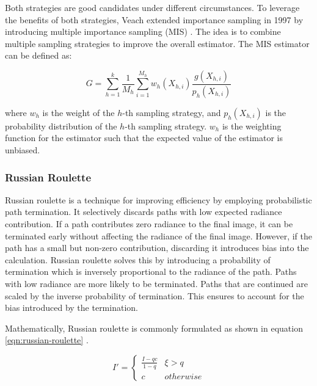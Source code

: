 Both strategies are good candidates under different circumstances. To leverage the benefits of both strategies, Veach extended importance sampling in 1997 by introducing multiple importance sampling (\gls{MIS}) \cite{veachMonteCarloLightTransport}. The idea is to combine multiple sampling strategies to improve the overall estimator. The \gls{MIS} estimator can be defined as:

\begin{equation}
  G = \sum_{h=1}^k \frac{1}{M_h}\sum_{i=1}^{M_h} w_h(X_{h,i})\frac{g(X_{h,i})}{p_h(X_{h,i})}
  \label{eq:multipleImportanceSampling}
\end{equation}

where $w_h$ is the weight of the $h$-th sampling strategy, and $p_h(X_{h,i})$ is the probability distribution of the $h$-th sampling strategy. $w_h$ is the weighting function for the estimator such that the expected value of the estimator is unbiased.

\subsubsection{Russian Roulette}
\label{ch:russianRoulette}

Russian roulette is a technique for improving efficiency by employing probabilistic path termination. It selectively discards paths with low expected radiance contribution. If a path contributes zero radiance to the final image, it can be terminated early without affecting the radiance of the final image. However, if the path has a small but non-zero contribution, discarding it introduces bias into the calculation. Russian roulette solves this by introducing a probability of termination which is inversely proportional to the radiance of the path. Paths with low radiance are more likely to be terminated. Paths that are continued are scaled by the inverse probability of termination. This ensures to account for the bias introduced by the termination.

Mathematically, Russian roulette is commonly formulated as shown in equation \ref{eqn:russian-roulette} \cite{Pharr_Physically_Based_Rendering_2023}.

\begin{equation}
  \label{eqn:russian-roulette}
  I' = \begin{cases} \frac{I-qc}{1-q} & \xi > q \\ c & otherwise \end{cases}
\end{equation}

